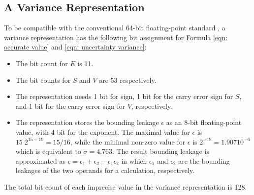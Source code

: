 \documentclass[twoside]{article}
\numberwithin{equation}{section}
\begin{document}
\subsection{A Variance Representation}

To be compatible with the conventional 64-bit floating-point standard \cite{Floating_Point_Standard}, a variance representation has the following bit assignment for Formula \eqref{eqn: accurate value} and \eqref{eqn: uncertainty variance}:
\begin{itemize}
\item The bit count for $E$ is 11.

\item The bit counts for $S$ and $V$ are 53 respectively.

\item The representation needs 1 bit for sign, 1 bit for the carry error sign for $S$, and 1 bit for the carry error sign for $V$, respectively.

\item The representation stores the bounding leakage $\epsilon$ as an 8-bit floating-point value, with 4-bit for the exponent.
The maximal value for $\epsilon$ is $15\;2^{15-19} = 15/16$, while the minimal non-zero value for $\epsilon$ is $2^{-19} = 1.907 10^{-6}$ which is equivalent to $\sigma=4.763$.
The result bounding leakage is approximated as $\epsilon = \epsilon_1 + \epsilon_2 - \epsilon_1 \epsilon_2$ in which $\epsilon_1$ and $\epsilon_2$ are the bounding leakages of the two operands for a calculation, respectively.
\end{itemize}
The total bit count of each imprecise value in the variance representation is 128.
\end{document}
